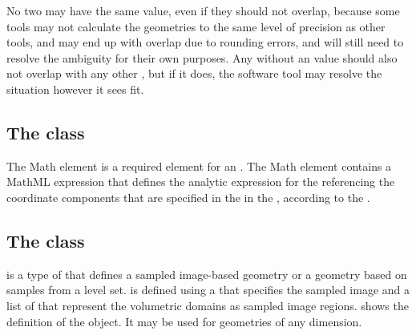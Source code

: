 No two \AnalyticVolumes may have the same  value, even if they should not overlap, because some tools may not calculate the geometries to the same level of precision as other tools, and may end up with overlap due to rounding errors, and will still need to resolve the ambiguity for their own purposes.  Any \AnalyticVolume without an  value should also not overlap with any other \AnalyticVolume, but if it does, the software tool may resolve the situation however it sees fit.


\subsection{The  class}
\label{Math-class}
The Math element is a required element for an \AnalyticVolume. The Math element contains a MathML expression that defines the analytic expression for the \AnalyticVolume referencing the coordinate components that are specified in the \ListOfCoordinateComponents in the \Geometry, according to the . 


\subsection{The  class}
\label{SampledFieldGeometry-class}
\label{ListOfSampledVolumes-class}
\SampledFieldGeometry is a type of \GeometryDefinition that defines a sampled image-based geometry or a geometry based on samples from a level set. \SampledFieldGeometry is defined using a \SampledField that specifies the sampled image and a list of \SampledVolumes that represent the volumetric domains as sampled image regions.  shows the definition of the \SampledFieldGeometry object.  It may be used for geometries of any dimension.

